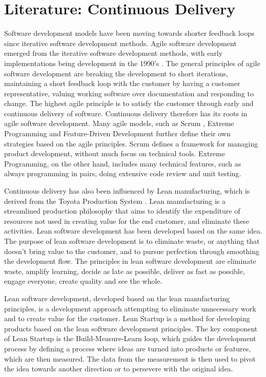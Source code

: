 \documentclass[english]{tktltiki2}
\theoremstyle{definition}
\theoremstyle{remark}
\begin{document}
\section{Literature: Continuous Delivery}
Software development models have been moving towards shorter feedback loops since iterative software development methods. Agile software development emerged from the iterative software development methods, with early implementations being development in the 1990's \cite{dybaa2008empirical}. The general principles of agile software development are breaking the development to short iterations, maintaining a short feedback loop with the customer by having a customer representative, valuing working software over documentation and responding to change. The highest agile principle is to satisfy the customer through early and continuous delivery of software. Continuous delivery therefore has its roots in agile software development. Many agile models, such as Scrum \cite{schwaber2002gile}, Extreme Programming \cite{beck2000extreme} and Feature-Driven Development \cite{palmer2001practical} further define their own strategies based on the agile principles. Scrum defines a framework for managing product development, without much focus on technical tools. Extreme Programming, on the other hand, includes many technical features, such as always programming in pairs, doing extensive code review and unit testing.

Continuous delivery has also been influenced by Lean manufacturing, which is derived from the Toyota Production System \cite{ono1988toyota}. Lean manufacturing is a streamlined production philosophy that aims to identify the expenditure of resources not used in creating value for the end customer, and eliminate these activities. Lean software development \cite{poppendieck2003lean} has been developed based on the same idea. The purpose of lean software development is to eliminate waste, or anything that doesn't bring value to the customer, and to pursue perfection through smoothing the development flow. The principles in lean software development are eliminate waste, amplify learning, decide as late as possible, deliver as fast as possible, engage everyone, create quality and see the whole. 

Lean software development, developed based on the lean manufacturing principles, is a development approach attempting to eliminate unnecessary work and to create value for the customer. Lean Startup \cite{ries2011lean} is a method for developing products based on the lean software development principles. The key component of Lean Startup is the Build-Measure-Learn loop, which guides the development process by defining a process where ideas are turned into products or features, which are then measured. The data from the measurement is then used to pivot the idea towards another direction or to persevere with the original idea.
\end{document}
